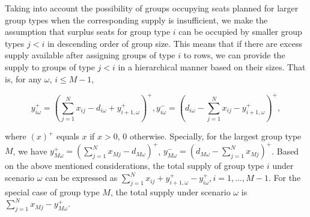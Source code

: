Taking into account the possibility of groups occupying seats planned for larger group types when the corresponding supply is insufficient, we make the assumption that surplus seats for group type $i$ can be occupied by smaller group types $j<i$ in descending order of group size. This means that if there are excess supply available after assigning groups of type $i$ to rows, we can provide the supply to groups of type $j<i$ in a hierarchical manner based on their sizes. That is, for any $\omega$, $i \leq M-1$, 

$$y_{i \omega}^{+}=\left(\sum_{j=1}^N x_{ij}- d_{i \omega} + y_{i+1, \omega}^{+}\right)^{+}, y_{i \omega}^{-}=\left(d_{i \omega}- \sum_{j=1}^N x_{ij} - y_{i+1, \omega}^{+} \right)^{+},$$

where $(x)^{+}$ equals $x$ if $x>0$, $0$ otherwise. Specially, for the largest group type $M$, we have $y_{M \omega}^{+} = (\sum_{j=1}^N x_{Mj} - d_{M \omega})^{+}$, $y_{M \omega}^{-} = (d_{M \omega}- \sum_{j=1}^N x_{Mj})^{+}$. Based on the above mentioned considerations, the total supply of group type $i$ under scenario $\omega$ can be expressed as $\sum_{j= 1}^{N} x_{ij} + y_{i+1,\omega}^{+} - y_{i \omega}^{+}, i = 1, \ldots, M-1$. For the special case of group type $M$, the total supply under scenario $\omega$ is $\sum_{j= 1}^{N} x_{Mj} - y_{M \omega}^{+}$.






